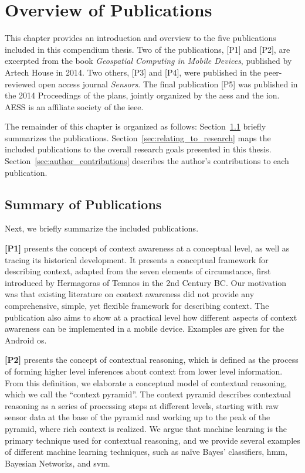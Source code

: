 \chapter{Overview of Publications}
\label{ch:overview_of_publications}

This chapter provides an introduction and overview to the five publications included in this compendium thesis. Two of the publications, [P1] and [P2], are excerpted from the book \emph{Geospatial Computing in Mobile Devices}, published by Artech House in 2014. Two others, [P3] and [P4], were published in the peer-reviewed open access journal \emph{Sensors}. The final publication [P5] was published in the 2014 Proceedings of the \gls{plans}, jointly organized by the \gls{aess} and the \gls{ion}. AESS is an affiliate society of the \gls{ieee}.

The remainder of this chapter is organized as follows: Section~\ref{sec:summary_of_publications} briefly summarizes the publications. Section~\ref{sec:relating_to_research} maps the included publications to the overall research goals presented in this thesis. Section~\ref{sec:author_contributions} describes the author's contributions to each publication. 

\section{Summary of Publications}
\label{sec:summary_of_publications}

Next, we briefly summarize the included publications.

\textbf{[P1]} presents the concept of context awareness at a conceptual level, as well as tracing its historical development. It presents a conceptual framework for describing context, adapted from the seven elements of circumstance, first introduced by Hermagoras of Temnos in the 2nd Century BC. Our motivation was that existing literature on context awareness did not provide any comprehensive, simple, yet flexible framework for describing context. The publication also aims to show at a practical level how different aspects of context awareness can be implemented in a mobile device. Examples are given for the Android \gls{os}.

\textbf{[P2]} presents the concept of contextual reasoning, which is defined as the process of forming higher level inferences about context from lower level information. From this definition, we elaborate a conceptual model of contextual reasoning, which we call the ``context pyramid''. The context pyramid describes contextual reasoning as a series of processing steps at different levels, starting with raw sensor data at the base of the pyramid and working up to the peak of the pyramid, where rich context is realized. We argue that machine learning is the primary technique used for contextual reasoning, and we provide several examples of different machine learning techniques, such as  na\"{i}ve Bayes' classifiers, \gls{hmm}, Bayesian Networks, and \gls{svm}.

